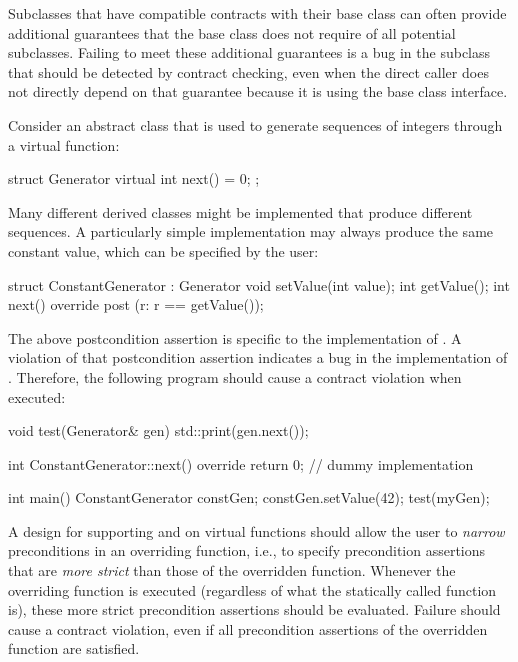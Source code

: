 Subclasses that have compatible contracts with their base class can often provide additional guarantees that the base class does not require of all potential subclasses. Failing to meet these additional guarantees is a bug in the subclass that should be detected by contract checking, even when the direct caller does not directly depend on that guarantee because it is using the base class interface.

Consider an abstract class that is used to generate sequences of integers through a virtual function:

\begin{codeblock}
struct Generator {
  virtual int next() = 0;
};
\end{codeblock}
Many different derived classes might be implemented that produce different sequences. A particularly simple implementation may always produce the same constant value, which can be specified by the user:
\begin{codeblock}
struct ConstantGenerator : Generator {
  void setValue(int value);
  int getValue(); 
  int next() override
    post (r: r == getValue());
}
\end{codeblock}
The above postcondition assertion is specific to the implementation of \allowbreak{}. A violation of that postcondition assertion indicates a bug in the implementation of . Therefore, the following program should cause a contract violation when executed:
\begin{codeblock}
void test(Generator& gen) {
  std::print(gen.next());
}

int ConstantGenerator::next() override {
  return 0;  // dummy implementation  
} 

int main() {
  ConstantGenerator constGen;
  constGen.setValue(42);
  test(myGen);
}
\end{codeblock}



A design for supporting  and  on virtual functions should allow the user to \emph{narrow} preconditions in an overriding function, i.e., to specify precondition assertions 
 that are \emph{more strict} than those of the overridden function. Whenever the overriding function is executed (regardless of what the statically called function is), these more strict precondition assertions should be evaluated. Failure should cause a contract violation, even if all precondition assertions of the overridden function are satisfied.
 
